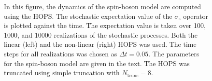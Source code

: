 \begin{figure}[h]
\begin{subfigure}[b]{0.495\textwidth}
    \end{subfigure}
    \label{fig:full_runs_HOPS} 
    \caption{In this figure, the dynamics of the spin-boson model are computed using the HOPS. The stochastic expectation value of the $\sigma_z$ operator is
    plotted against the time. The expectation value is taken over 100, 1000, and 10000 realizations of the stochastic processes. Both the linear (left) and the non-linear (right)
    HOPS was used. The time steps for all realizations was chosen as $\Delta t = 0.05$. The parameters for the spin-boson model are
    given in the text. The  HOPS was truncated using simple truncation with $N_\text{trunc} = 8$.}
\end{figure}